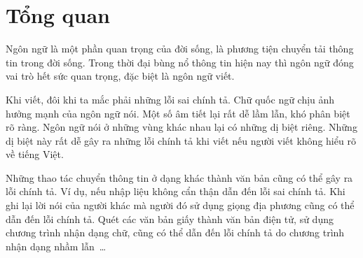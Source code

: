 \documentclass[a4paper,oneside,14pt]{extbook} %
\begin{document}




























\chapter{Tổng quan}
\label{cha:overview}
\minitoc


Ngôn ngữ là một phần quan trọng của đời sống, là phương tiện chuyển
tải thông tin trong đời sống. Trong thời đại bùng nổ thông tin hiện
nay thì ngôn ngữ đóng vai trò hết sức quan trọng, đặc biệt là ngôn ngữ
viết. 

Khi viết, đôi khi ta mắc phải những lỗi sai chính tả. Chữ quốc ngữ
chịu ảnh hưởng mạnh của ngôn ngữ nói. Một số âm tiết lại rất dễ 
lầm lẫn, khó phân biệt rõ ràng. Ngôn ngữ nói ở những vùng khác nhau lại
có những dị biệt riêng. Những dị biệt này rất dễ gây ra
những lỗi chính tả khi viết nếu người viết không hiểu rõ về tiếng
Việt.

Những thao tác chuyển thông tin ở dạng khác thành văn bản cũng có thể
gây ra lỗi chính tả. Ví dụ, nếu nhập liệu không cẩn thận dẫn đến lỗi
sai chính tả. Khi ghi lại lời nói của người khác mà người đó sử dụng
giọng địa phương cũng có thể dẫn đến lỗi chính tả. Quét các văn bản
giấy thành văn bản điện tử, sử dụng chương trình nhận dạng chữ, cũng
có thể dẫn đến lỗi chính tả do chương trình nhận dạng nhầm lẫn~\ldots{}
\end{document}
